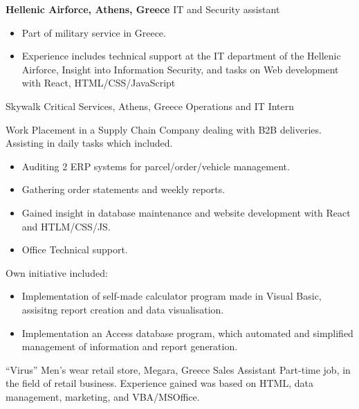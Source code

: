 {\textbf{Hellenic Airforce, Athens, Greece}}
{IT and Security assistant}
{
    \begin{itemize}
        \item Part of military service in Greece.
        \item Experience includes technical support at the IT department of the Hellenic Airforce, Insight into Information Security, and tasks on Web development with React, HTML/CSS/JavaScript
    \end{itemize}
}

{Skywalk Critical Services, Athens, Greece }
{Operations and IT Intern}
{

    Work Placement in a Supply Chain Company dealing with B2B deliveries. Assisting in daily tasks which included.
    \begin{itemize}
        \item Auditing 2 ERP systems for parcel/order/vehicle management.
        \item Gathering order statements and weekly reports.
        \item Gained insight in database maintenance and website development with React and HTLM/CSS/JS.
        \item Office Technical support.
    \end{itemize}

    Own initiative included:
    \begin{itemize}
        \item Implementation of self-made calculator program made in Visual Basic, assisitng report creation and data visualisation.
        \item Implementation an Access database program, which automated and simplified management of information and report generation.
    \end{itemize}
}

{“Virus” Men’s wear retail store, Megara, Greece}
{Sales Assistant}
{
    Part-time job, in the field of retail business. Experience gained was based on HTML, data management, marketing, and VBA/MSOffice.
}

